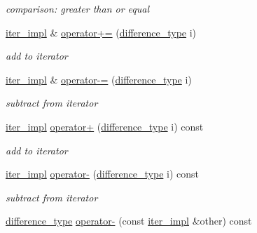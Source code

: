 \begin{DoxyCompactItemize}
\begin{DoxyCompactList}\small\item\em comparison\+: greater than or equal \end{DoxyCompactList}\item 
\hyperlink{classnlohmann_1_1detail_1_1iter__impl}{iter\+\_\+impl} \& \hyperlink{classnlohmann_1_1detail_1_1iter__impl_a3eef94f9d167046e7f773aeb6b78090c}{operator+=} (\hyperlink{classnlohmann_1_1detail_1_1iter__impl_a2f7ea9f7022850809c60fc3263775840}{difference\+\_\+type} i)
\begin{DoxyCompactList}\small\item\em add to iterator \end{DoxyCompactList}\item 
\hyperlink{classnlohmann_1_1detail_1_1iter__impl}{iter\+\_\+impl} \& \hyperlink{classnlohmann_1_1detail_1_1iter__impl_abcc9d51bc52f2e8483bbe4018f05e978}{operator-\/=} (\hyperlink{classnlohmann_1_1detail_1_1iter__impl_a2f7ea9f7022850809c60fc3263775840}{difference\+\_\+type} i)
\begin{DoxyCompactList}\small\item\em subtract from iterator \end{DoxyCompactList}\item 
\hyperlink{classnlohmann_1_1detail_1_1iter__impl}{iter\+\_\+impl} \hyperlink{classnlohmann_1_1detail_1_1iter__impl_a8ef76aeb5a5032768f0f61f48ac189c0}{operator+} (\hyperlink{classnlohmann_1_1detail_1_1iter__impl_a2f7ea9f7022850809c60fc3263775840}{difference\+\_\+type} i) const
\begin{DoxyCompactList}\small\item\em add to iterator \end{DoxyCompactList}\item 
\hyperlink{classnlohmann_1_1detail_1_1iter__impl}{iter\+\_\+impl} \hyperlink{classnlohmann_1_1detail_1_1iter__impl_a0dd9c415b94a02ff2aa25da75e52da30}{operator-\/} (\hyperlink{classnlohmann_1_1detail_1_1iter__impl_a2f7ea9f7022850809c60fc3263775840}{difference\+\_\+type} i) const
\begin{DoxyCompactList}\small\item\em subtract from iterator \end{DoxyCompactList}\item 
\hyperlink{classnlohmann_1_1detail_1_1iter__impl_a2f7ea9f7022850809c60fc3263775840}{difference\+\_\+type} \hyperlink{classnlohmann_1_1detail_1_1iter__impl_a49bf3e708a9c1c88c415011735962d06}{operator-\/} (const \hyperlink{classnlohmann_1_1detail_1_1iter__impl}{iter\+\_\+impl} \&other) const

\end{DoxyCompactItemize}
